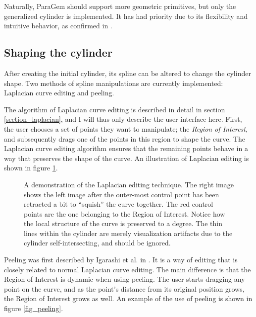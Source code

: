 \documentclass[english]{article}
\begin{document}
Naturally, ParaGem should support more geometric primitives, but only the generalized cylinder is implemented. It has had priority due to its flexibility and intuitive behavior, as confirmed in \cite{gingold09}.

\subsection{Shaping the cylinder}


After creating the initial cylinder, its spline can be altered to change the cylinder shape. Two methods of spline manipulations are currently implemented: Laplacian curve editing and peeling.

The algorithm of Laplacian curve editing is described in detail in section \ref{section_laplacian}, and I will thus only describe the user interface here. First, the user chooses a set of points they want to manipulate; the \textit{Region of Interest}, and subsequently drags one of the points in this region to shape the curve. The Laplacian curve editing algorithm ensures that the remaining points behave in a way that preserves the shape of the curve. An illustration of Laplacian editing is shown in figure \ref{fig_laplacian}.

\begin{figure}
  \centering
  \qquad

  \caption{A demonstration of the Laplacian editing technique. The right image shows the left image after the outer-most control point has been retracted a bit to ``squish'' the curve together. The red control points are the one belonging to the Region of Interest. Notice how the local structure of the curve is preserved to a degree. The thin lines within the cylinder are merely visualization artifacts due to the cylinder self-intersecting, and should be ignored.}
  \label{fig_laplacian}
\end{figure}


Peeling was first described by Igarashi et al. in \cite{rigid_igarashi}. It is a way of editing that is closely related to normal Laplacian curve editing. The main difference is that the Region of Interest is dynamic when using peeling. The user starts dragging any point on the curve, and as the point's distance from its original position grows, the Region of Interest grows as well. An example of the use of peeling is shown in figure \ref{fig_peeling}.
\end{document}
